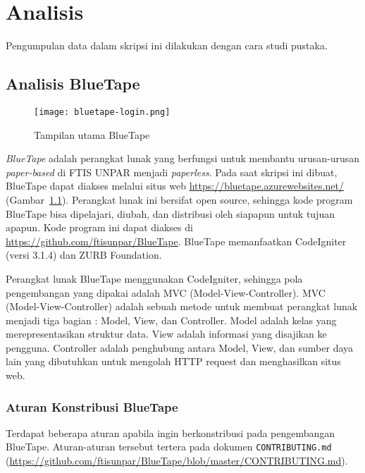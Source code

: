 
\chapter{Analisis}
\label{chap:analisis}
Pengumpulan data dalam skripsi ini dilakukan dengan cara studi pustaka.

\section{Analisis BlueTape}
\label{sec:analisisbluetape}
\begin{figure}[H]
	\centering  
	\texttt{[image: bluetape-login.png]}  
	\caption[Tampilan utama BlueTape]{Tampilan utama BlueTape} 
	\label{fig:bluetape-login} 
\end{figure}

\textit{BlueTape} adalah perangkat lunak yang berfungsi untuk membantu urusan-urusan \textit{paper-based} di FTIS UNPAR menjadi \textit{paperless}. Pada saat skripsi ini dibuat, BlueTape dapat diakses melalui situs web \url{https://bluetape.azurewebsites.net/} (Gambar~\ref{fig:bluetape-login}). Perangkat lunak ini bersifat open source, sehingga kode program BlueTape bisa dipelajari, diubah, dan distribusi oleh siapapun untuk tujuan apapun. Kode program ini dapat diakses di \url{https://github.com/ftisunpar/BlueTape}. BlueTape memanfaatkan CodeIgniter (versi 3.1.4) dan ZURB Foundation.

Perangkat lunak BlueTape menggunakan CodeIgniter, sehingga pola pengembangan yang dipakai adalah MVC (Model-View-Controller). MVC (Model-View-Controller) adalah sebuah metode untuk membuat perangkat lunak menjadi tiga bagian : Model, View, dan Controller. Model adalah kelas yang merepresentasikan struktur data. View adalah informasi yang disajikan ke pengguna. Controller adalah penghubung antara Model, View, dan sumber daya lain yang dibutuhkan untuk mengolah HTTP request dan menghasilkan situs web.

\subsection{Aturan Konstribusi BlueTape}
Terdapat beberapa aturan apabila ingin berkonstribusi pada pengembangan BlueTape. Aturan-aturan tersebut tertera pada dokumen \texttt{CONTRIBUTING.md} (\url{https://github.com/ftisunpar/BlueTape/blob/master/CONTRIBUTING.md}).
